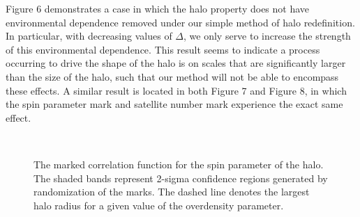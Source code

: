 \documentclass[usenatbib,usegraphicx,letterpaper]{mn2e}
\begin{document}
Figure 6 demonstrates a case in which the halo property does not have environmental dependence removed under our simple method of halo redefinition. In particular, with decreasing values of $\Delta$, we only serve to increase the strength of this environmental dependence. This result seems to indicate a process occurring to drive the shape of the halo is on scales that are significantly larger than the size of the halo, such that our method will not be able to encompass these effects. A similar result is located in both Figure 7 and Figure 8, in which the spin parameter mark and satellite number mark experience the exact same effect.

\begin{figure}
	\centering
	\\
	\caption{The marked correlation function for the spin parameter of the halo. The shaded bands represent 2-sigma confidence regions generated by randomization of the marks. The dashed line denotes the largest halo radius for a given value of the overdensity parameter.}
\end{figure}
\end{document}

